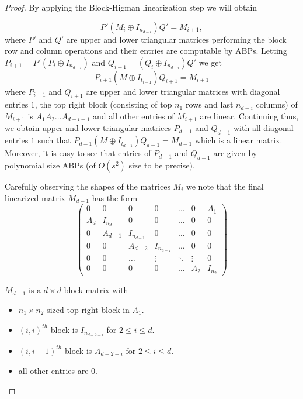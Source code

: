 \documentclass[10pt,a4paper]{article}
\begin{document}
\begin{proof}
By applying the Block-Higman linearization step we will obtain

%
%
%
%
%
%
%
%

%
%
%
%
%
%
%
%

\[
P'(M_i \oplus I_{n_{d-i}})Q' = M_{i+1},
\] 
where $P'$ and $Q'$ are upper and lower triangular matrices performing
the block row and column operations and their entries are computable
by ABPs. Letting $P_{i+1} = P' (P_i \oplus I_{n_{d-i}})$ and
$Q_{i+1}= (Q_i \oplus I_{n_{d-i}}) Q'$ we get
\[
P_{i+1} (M \oplus I_{t_{i+1}}) Q_{i+1} = M_{i+1}
\]
where $P_{i+1}$ and $Q_{i+1}$ are upper and lower triangular matrices
with diagonal entries $1$, the top right block (consisting of top
$n_1$ rows and last $n_{d-i}$ columns) of $M_{i+1}$ is
$A_1A_2 \ldots A_{d-i-1}$ and all other entries of $M_{i+1}$ are
linear. Continuing thus, we obtain upper and lower triangular matrices
$P_{d-1}$ and $Q_{d-1}$ with all diagonal entries $1$ such that
$P_{d-1} (M \oplus I_{t_{d-1}})Q_{d-1}= M_{d-1}$ which is a linear
matrix. Moreover, it is easy to see that entries of $P_{d-1}$ and
$Q_{d-1}$ are given by polynomial size ABPs (of $O(s^2)$ size to be
precise).

Carefully observing the shapes of the matrices $M_i$ we note that the
final linearized matrix $M_{d-1}$ has the form
\[
\left(
\begin{array}{ccccccc}
0 & 0 & 0 & 0 & \ldots & 0 & A_1\\
%
A_d & I_{n_{d}} & 0 & 0 & \ldots & 0 & 0\\
0 & A_{d-1} & I_{n_{d-1}} & 0 & \ldots & 0 & 0 \\
0 & 0 & A_{d-2} & I_{n_{d-2}}& \ldots & 0 & 0 \\
0 & 0 & \ldots & \vdots & \ddots & \vdots & 0\\
0& 0 & 0& 0 & \ldots & A_2 & I_{n_2}
\end{array} 
\right)
\]

$M_{d-1}$ is a $d\times d$ block matrix with
\begin{itemize}
\item[-]  $n_1\times n_2$ sized top right block in $A_1$.
\item[-]  $(i,i)^{th}$ block is $I_{n_{d+2-i}}$ for $2\leq i \leq d$.
\item[-] $(i,i-1)^{th}$ block is $A_{d+2-i}$ for $2\leq i \leq d$.
\item[-] all other entries are $0$.
\end{itemize}

\end{proof}
\end{document}
